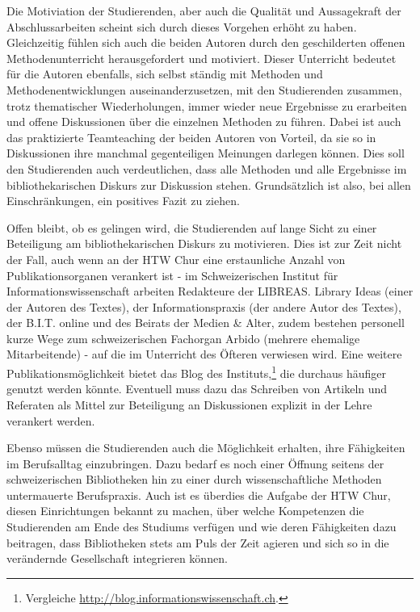 \documentclass[a4paper,
fontsize=11pt,
oneside,
numbers=noperiodatend,
parskip=half-,
bibliography=totoc,
final
]{scrartcl}
\begin{document}
Die Motiviation der Studierenden, aber auch die Qualität und
Aussagekraft der Abschlussarbeiten scheint sich durch dieses Vorgehen
erhöht zu haben. Gleichzeitig fühlen sich auch die beiden Autoren durch
den geschilderten offenen Methodenunterricht herausgefordert und
motiviert. Dieser Unterricht bedeutet für die Autoren ebenfalls, sich
selbst ständig mit Methoden und Methodenentwicklungen
auseinanderzusetzen, mit den Studierenden zusammen, trotz thematischer
Wiederholungen, immer wieder neue Ergebnisse zu erarbeiten und offene
Diskussionen über die einzelnen Methoden zu führen. Dabei ist auch das
praktizierte Teamteaching der beiden Autoren von Vorteil, da sie so in
Diskussionen ihre manchmal gegenteiligen Meinungen darlegen können. Dies
soll den Studierenden auch verdeutlichen, dass alle Methoden und alle
Ergebnisse im bibliothekarischen Diskurs zur Diskussion stehen.
Grundsätzlich ist also, bei allen Einschränkungen, ein positives Fazit
zu ziehen.

Offen bleibt, ob es gelingen wird, die Studierenden auf lange Sicht zu
einer Beteiligung am bibliothekarischen Diskurs zu motivieren. Dies ist
zur Zeit nicht der Fall, auch wenn an der HTW Chur eine erstaunliche
Anzahl von Publikationsorganen verankert ist - im Schweizerischen
Institut für Informationswissenschaft arbeiten Redakteure der LIBREAS.
Library Ideas (einer der Autoren des Textes), der Informationspraxis
(der andere Autor des Textes), der B.I.T. online und des Beirats der
Medien \& Alter, zudem bestehen personell kurze Wege zum schweizerischen
Fachorgan Arbido (mehrere ehemalige Mitarbeitende) - auf die im
Unterricht des Öfteren verwiesen wird. Eine weitere
Publikationsmöglichkeit bietet das Blog des Instituts,\footnote{Vergleiche
  \url{http://blog.informationswissenschaft.ch}.} die durchaus häufiger
genutzt werden könnte. Eventuell muss dazu das Schreiben von Artikeln
und Referaten als Mittel zur Beteiligung an Diskussionen explizit in der
Lehre verankert werden.

Ebenso müssen die Studierenden auch die Möglichkeit erhalten, ihre
Fähigkeiten im Berufsalltag einzubringen. Dazu bedarf es noch einer
Öffnung seitens der schweizerischen Bibliotheken hin zu einer durch
wissenschaftliche Methoden untermauerte Berufspraxis. Auch ist es
überdies die Aufgabe der HTW Chur, diesen Einrichtungen bekannt zu
machen, über welche Kompetenzen die Studierenden am Ende des Studiums
verfügen und wie deren Fähigkeiten dazu beitragen, dass Bibliotheken
stets am Puls der Zeit agieren und sich so in die verändernde
Gesellschaft integrieren können.
\end{document}
